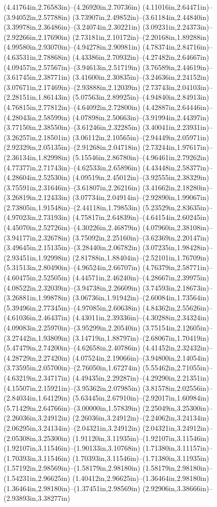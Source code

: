 (4.41764in,2.76583in)--(4.26920in,2.70736in) (4.11016in,2.64471in)--(3.94052in,2.57788in) (3.73907in,2.49852in)--(3.61184in,2.44840in) (3.39978in,2.36486in)--(3.24074in,2.30221in) (3.09231in,2.24373in)--(2.92266in,2.17690in) (2.73181in,2.10172in)--(2.20168in,1.89288in) (4.99580in,2.93070in)--(4.94278in,2.90981in) (4.78374in,2.84716in)--(4.63531in,2.78868in) (4.43386in,2.70932in)--(4.27482in,2.64667in) (4.09457in,2.57567in)--(3.94613in,2.51719in) (3.76589in,2.44619in)--(3.61745in,2.38771in) (3.41600in,2.30835in)--(3.24636in,2.24152in) (3.07671in,2.17469in)--(2.93888in,2.12039in) (2.73743in,2.04103in)--(2.28151in,1.86143in) (5.07563in,2.89925in)--(4.94840in,2.84913in) (4.76815in,2.77812in)--(4.64092in,2.72800in) (4.42887in,2.64446in)--(4.28043in,2.58599in) (4.07898in,2.50663in)--(3.91994in,2.44397in) (3.77150in,2.38550in)--(3.61246in,2.32285in) (3.40041in,2.23931in)--(3.26257in,2.18501in) (3.06112in,2.10565in)--(2.94449in,2.05971in) (2.92329in,2.05135in)--(2.91268in,2.04718in) (2.73244in,1.97617in)--(2.36134in,1.82998in) (5.15546in,2.86780in)--(4.96461in,2.79262in) (4.77377in,2.71743in)--(4.62533in,2.65896in) (4.43448in,2.58377in)--(4.28604in,2.52530in) (4.09519in,2.45012in)--(3.92555in,2.38329in) (3.75591in,2.31646in)--(3.61807in,2.26216in) (3.41662in,2.18280in)--(3.26819in,2.12433in) (3.07734in,2.04914in)--(2.92890in,1.99067in) (2.73805in,1.91548in)--(2.44118in,1.79853in) (5.23529in,2.83635in)--(4.97023in,2.73193in) (4.75817in,2.64839in)--(4.64154in,2.60245in) (4.45070in,2.52726in)--(4.30226in,2.46879in) (4.07960in,2.38108in)--(3.94177in,2.32678in) (3.75092in,2.25160in)--(3.62369in,2.20147in) (3.49645in,2.15135in)--(3.28440in,2.06782in) (3.07235in,1.98428in)--(2.93451in,1.92998in) (2.81788in,1.88404in)--(2.52101in,1.76709in) (5.31513in,2.80490in)--(4.96524in,2.66707in) (4.76379in,2.58771in)--(4.60475in,2.52505in) (4.44571in,2.46240in)--(4.28667in,2.39975in) (4.08522in,2.32039in)--(3.94738in,2.26609in) (3.74593in,2.18673in)--(3.26881in,1.99878in) (3.06736in,1.91942in)--(2.60084in,1.73564in) (5.39496in,2.77345in)--(4.97085in,2.60638in) (4.84362in,2.55626in)--(4.61036in,2.46437in) (4.43011in,2.39336in)--(4.30288in,2.34324in) (4.09083in,2.25970in)--(3.95299in,2.20540in) (3.75154in,2.12605in)--(3.27442in,1.93809in) (3.14719in,1.88797in)--(2.68067in,1.70419in) (5.47479in,2.74200in)--(4.62658in,2.40786in) (4.41452in,2.32432in)--(4.28729in,2.27420in) (4.07524in,2.19066in)--(3.94800in,2.14054in) (3.73595in,2.05700in)--(2.76050in,1.67274in) (5.55462in,2.71055in)--(4.63219in,2.34717in) (4.49435in,2.29287in)--(4.29290in,2.21351in) (4.15507in,2.15921in)--(3.95362in,2.07985in) (3.81578in,2.02556in)--(2.84034in,1.64129in) (5.63445in,2.67910in)--(2.92017in,1.60984in) (5.71429in,2.64766in)--(3.00000in,1.57839in) (2.25049in,3.25300in)--(2.26036in,3.24912in) (2.26036in,3.24912in)--(2.24062in,3.24134in) (2.06295in,3.24134in)--(2.04321in,3.24912in) (2.04321in,3.24912in)--(2.05308in,3.25300in) (1.91120in,3.11935in)--(1.92107in,3.11546in) (1.92107in,3.11546in)--(1.90133in,3.10768in) (1.71380in,3.11157in)--(1.70393in,3.11546in) (1.70393in,3.11546in)--(1.71380in,3.11935in) (1.57192in,2.98569in)--(1.58179in,2.98180in) (1.58179in,2.98180in)--(1.54231in,2.96625in) (1.40412in,2.96625in)--(1.36464in,2.98180in) (1.36464in,2.98180in)--(1.37451in,2.98569in) (2.92906in,3.38666in)--(2.93893in,3.38277in) 